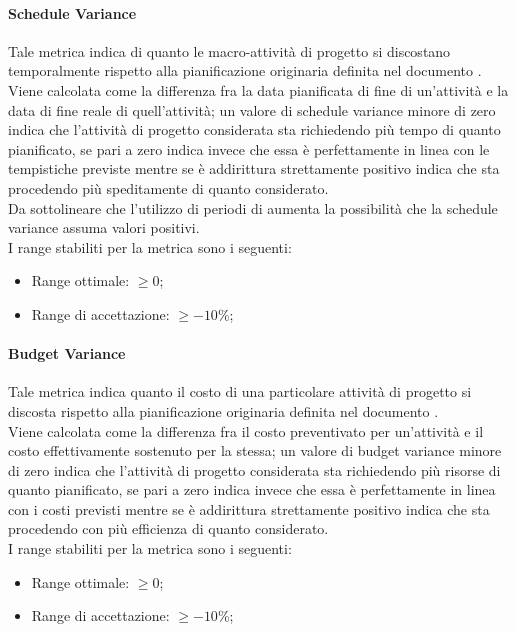 			\paragraph{Schedule Variance}
			Tale metrica indica di quanto le macro-attività di progetto si discostano temporalmente rispetto alla pianificazione originaria definita nel documento \PdP . 
			\\Viene calcolata come la differenza fra la data pianificata di fine di un'attività e la data di fine reale di quell'attività; un valore di schedule variance minore di zero indica che l'attività di progetto considerata sta richiedendo più tempo di quanto pianificato, se pari a zero indica invece che essa è perfettamente in linea con le tempistiche previste mentre se è addirittura strettamente positivo indica che sta procedendo più speditamente di quanto considerato. 
			\\Da sottolineare che l'utilizzo di periodi di  aumenta la possibilità che la schedule variance assuma valori positivi.
			\\I range stabiliti per la metrica sono i seguenti:
				\begin{itemize}
					\item Range ottimale: $\geq{0}$;
					\item Range di accettazione: $\geq{-10}$\%;
				\end{itemize}

			\paragraph{Budget Variance}
			Tale metrica indica quanto il costo di una particolare attività di progetto si discosta rispetto alla pianificazione originaria definita nel documento \PdP. 
			\\Viene calcolata come la differenza fra il costo preventivato per un'attività e il costo effettivamente sostenuto per la stessa; un valore di budget variance minore di zero indica che l'attività di progetto considerata sta richiedendo più risorse di quanto pianificato, se pari a zero indica invece che essa è perfettamente in linea con i costi previsti mentre se è addirittura strettamente positivo indica che sta procedendo con più efficienza di quanto considerato.
			\\I range stabiliti per la metrica sono i seguenti:
				\begin{itemize}
					\item Range ottimale: $\geq{0}$;
					\item Range di accettazione: $\geq{-10}$\%;
				\end{itemize}
				
